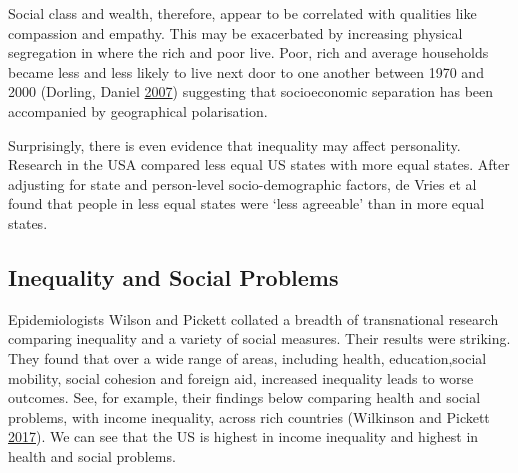 \documentclass[]{tufte-handout}
\begin{document}
Social class and wealth, therefore, appear to be correlated with
qualities like compassion and empathy. This may be exacerbated by
increasing physical segregation in where the rich and poor live. Poor,
rich and average households became less and less likely to live next
door to one another between 1970 and 2000 (Dorling, Daniel
\protect\hyperlink{ref-DorlingDaniel2007}{2007}) suggesting that
socioeconomic separation has been accompanied by geographical
polarisation.

Surprisingly, there is even evidence that inequality may affect
personality. Research in the USA compared less equal US states with more
equal states. After adjusting for state and person-level
socio-demographic factors, de Vries et al found that people in less
equal states were `less agreeable' than in more equal states.

\hypertarget{inequality-and-social-problems}{%
\subsection{Inequality and Social
Problems}\label{inequality-and-social-problems}}

Epidemiologists Wilson and Pickett collated a breadth of transnational
research comparing inequality and a variety of social measures. Their
results were striking. They found that over a wide range of areas,
including health, education,social mobility, social cohesion and foreign
aid, increased inequality leads to worse outcomes. See, for example,
their findings below comparing health and social problems, with income
inequality, across rich countries (Wilkinson and Pickett
\protect\hyperlink{ref-Wilkinson2017}{2017}). We can see that the US is
highest in income inequality and highest in health and social problems.
\end{document}

